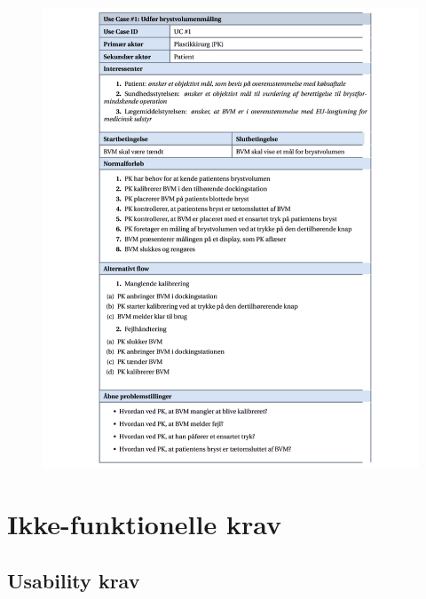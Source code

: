   			\begin{figure}[htb]
  				\flushleft
  					\includegraphics[width=7in]{UC1tabel}
  			\end{figure}
  			
	
	\section{Ikke-funktionelle krav}
	
	\subsection{Usability krav}
	
